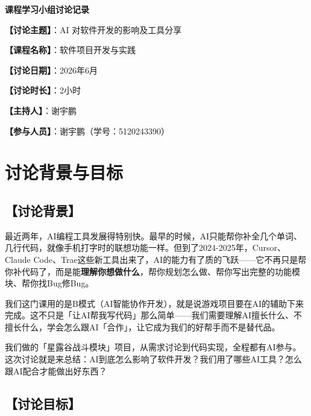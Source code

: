 \documentclass[12pt,a4paper]{article}
\begin{document}
\begin{center}
{\LARGE\bfseries 课程学习小组讨论记录}
\end{center}

\vspace{0.5cm}

\noindent\textbf{【讨论主题】}：AI 对软件开发的影响及工具分享

\vspace{0.3cm}
\noindent\textbf{【课程名称】}：软件项目开发与实践

\vspace{0.3cm}
\noindent\textbf{【讨论日期】}：2026年6月

\vspace{0.3cm}
\noindent\textbf{【讨论时长】}：2小时

\vspace{0.3cm}
\noindent\textbf{【主持人】}：谢宇鹏

\vspace{0.3cm}
\noindent\textbf{【参与人员】}：谢宇鹏（学号：5120243390）

\vspace{0.8cm}

\section{讨论背景与目标}

\subsection{【讨论背景】}

最近两年，AI编程工具发展得特别快。最早的时候，AI只能帮你补全几个单词、几行代码，就像手机打字时的联想功能一样。但到了2024-2025年，Cursor、Claude Code、Trae这些新工具出来了，AI的能力有了质的飞跃——它不再只是帮你补代码了，而是能\textbf{理解你想做什么}，帮你规划怎么做、帮你写出完整的功能模块、帮你找Bug修Bug。

我们这门课用的是B模式（AI智能协作开发），就是说游戏项目要在AI的辅助下来完成。这不只是「让AI帮我写代码」那么简单——我们需要理解AI擅长什么、不擅长什么，学会怎么跟AI「合作」，让它成为我们的好帮手而不是替代品。

我们做的「星露谷战斗模块」项目，从需求讨论到代码实现，全程都有AI参与。这次讨论就是来总结：AI到底怎么影响了软件开发？我们用了哪些AI工具？怎么跟AI配合才能做出好东西？

\subsection{【讨论目标】}
\end{document}
